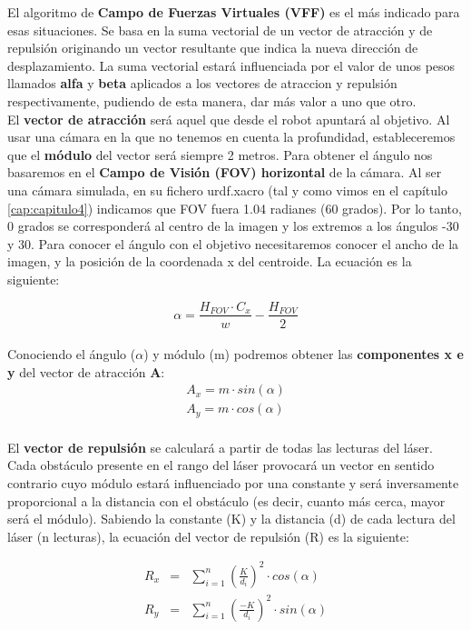 El algoritmo de \textbf{Campo de Fuerzas Virtuales (VFF)} es el más indicado para esas situaciones. Se basa en la suma vectorial de un vector de atracción y de repulsión originando un vector resultante que indica la nueva dirección de desplazamiento. La suma vectorial estará influenciada por el valor de unos pesos llamados \textbf{alfa} y \textbf{beta} aplicados a los vectores de atraccion y repulsión respectivamente, pudiendo de esta manera, dar más valor a uno que otro.\\

El \textbf{vector de atracción} será aquel que desde el robot apuntará al objetivo. Al usar una cámara en la que no tenemos en cuenta la profundidad, estableceremos que el \textbf{módulo} del vector será siempre 2 metros. Para obtener el ángulo nos basaremos en el \textbf{Campo de Visión (FOV) horizontal} de la cámara. Al ser una cámara simulada, en su fichero urdf.xacro (tal y como vimos en el capítulo \ref{cap:capitulo4}) indicamos que FOV fuera 1.04 radianes (60 grados). Por lo tanto, 0 grados se corresponderá al centro de la imagen y los extremos a los ángulos -30 y 30. Para conocer el ángulo con el objetivo necesitaremos conocer el ancho de la imagen, y la posición de la coordenada x del centroide. La ecuación es la siguiente:

\begin{equation*}
\alpha = \frac{H_{FOV} \cdot C_{x}}{w} - \frac{H_{FOV}}{2}
\end{equation*}\\

Conociendo el ángulo ($\alpha$) y módulo (m) podremos obtener las \textbf{componentes x e y} del vector de atracción \textbf{A}:
\begin{eqnarray*}
A_x = m \cdot sin(\alpha)\\
A_y = m \cdot cos(\alpha)\\
\end{eqnarray*}

El \textbf{vector de repulsión} se calculará a partir de todas las lecturas del láser. Cada obstáculo presente en el rango del láser provocará un vector en sentido contrario cuyo módulo estará influenciado por una constante y será inversamente proporcional a la distancia con el obstáculo (es decir, cuanto más cerca, mayor será el módulo). Sabiendo la constante (K) y la distancia (d) de cada lectura del láser (n lecturas), la ecuación del vector de repulsión (R) es la siguiente:

\begin{eqnarray*}
R_x &=& \sum_{i=1}^n\left(\frac{K}{d_i}\right)^2 \cdot cos(\alpha)\\
R_y &=& \sum_{i=1}^n\left(\frac{-K}{d_i}\right)^2 \cdot sin(\alpha)\\
\end{eqnarray*}

